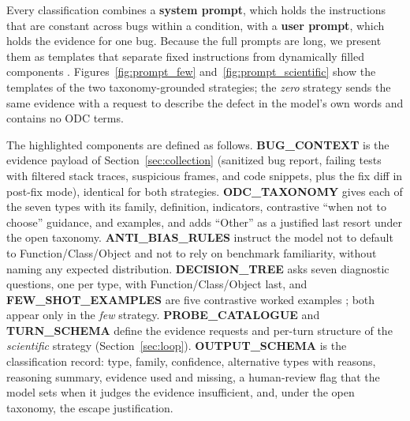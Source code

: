 \documentclass{iutbscthesis}
\begin{document}
Every classification combines a \textbf{system prompt}, which holds the instructions that are constant across bugs within a condition, with a \textbf{user prompt}, which holds the evidence for one bug. Because the full prompts are long, we present them as templates that separate fixed instructions from dynamically filled components \cite{baltes2026guidelines}. Figures~\ref{fig:prompt_few} and~\ref{fig:prompt_scientific} show the templates of the two taxonomy-grounded strategies; the \textit{zero} strategy sends the same evidence with a request to describe the defect in the model's own words and contains no ODC terms.

The highlighted components are defined as follows. \textbf{BUG\_CONTEXT} is the evidence payload of Section~\ref{sec:collection} (sanitized bug report, failing tests with filtered stack traces, suspicious frames, and code snippets, plus the fix diff in post-fix mode), identical for both strategies. \textbf{ODC\_TAXONOMY} gives each of the seven types with its family, definition, indicators, contrastive ``when not to choose'' guidance, and examples, and adds ``Other'' as a justified last resort under the open taxonomy. \textbf{ANTI\_BIAS\_RULES} instruct the model not to default to Function/\allowbreak Class/\allowbreak Object and not to rely on benchmark familiarity, without naming any expected distribution. \textbf{DECISION\_TREE} asks seven diagnostic questions, one per type, with Function/\allowbreak Class/\allowbreak Object last, and \textbf{FEW\_SHOT\_EXAMPLES} are five contrastive worked examples \cite{koyuncu2025exploring}; both appear only in the \textit{few} strategy. \textbf{PROBE\_CATALOGUE} and \textbf{TURN\_SCHEMA} define the evidence requests and per-turn structure of the \textit{scientific} strategy (Section~\ref{sec:loop}). \textbf{OUTPUT\_SCHEMA} is the classification record: type, family, confidence, alternative types with reasons, reasoning summary, evidence used and missing, a human-review flag that the model sets when it judges the evidence insufficient, and, under the open taxonomy, the escape justification.
\end{document}
